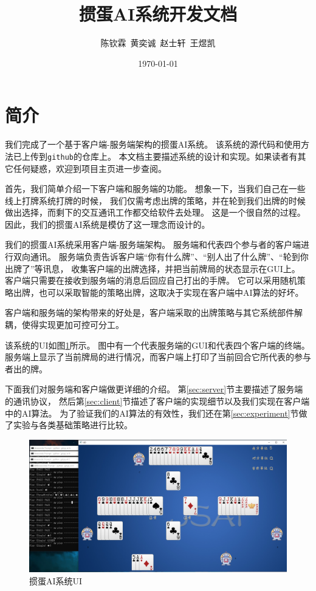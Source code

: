 \documentclass[a4paper]{ctexart}
\title{\textbf{掼蛋AI系统开发文档}}
\author{陈钦霖\ 黄奕诚\ 赵士轩\ 王煜凯}
\date{\today}
\begin{document}
\maketitle

\section{简介}
我们完成了一个基于客户端-服务端架构的掼蛋AI系统。
该系统的源代码和使用方法已上传到\texttt{github}的仓库上\cite{guandan-ai}。
本文档主要描述系统的设计和实现。如果读者有其它任何疑惑，欢迎到项目主页进一步查阅。

首先，我们简单介绍一下客户端和服务端的功能。
想象一下，当我们自己在一些线上打牌系统打牌的时候，
我们仅需考虑出牌的策略，并在轮到我们出牌的时候做出选择，而剩下的交互通讯工作都交给软件去处理。
这是一个很自然的过程。因此，我们的掼蛋AI系统是模仿了这一理念而设计的。

我们的掼蛋AI系统采用客户端-服务端架构。
服务端和代表四个参与者的客户端进行双向通讯。
服务端负责告诉客户端``你有什么牌''、``别人出了什么牌''、``轮到你出牌了''等讯息，
收集客户端的出牌选择，并把当前牌局的状态显示在GUI上。
客户端只需要在接收到服务端的消息后回应自己打出的手牌。
它可以采用随机策略出牌，也可以采取智能的策略出牌，这取决于实现在客户端中AI算法的好坏。

客户端和服务端的架构带来的好处是，客户端采取的出牌策略与其它系统部件解耦，使得实现更加可控可分工。

该系统的UI如图\ref{fig:ui}所示。
图中有一个代表服务端的GUI和代表四个客户端的终端。
服务端上显示了当前牌局的进行情况，而客户端上打印了当前回合它所代表的参与者出的牌。

下面我们对服务端和客户端做更详细的介绍。
第\ref{sec:server}节主要描述了服务端的通讯协议，
然后第\ref{sec:client}节描述了客户端的实现细节以及我们实现在客户端中的AI算法。
为了验证我们的AI算法的有效性，我们还在第\ref{sec:experiment}节做了实验与各类基础策略进行比较。

\begin{figure}
  \centering
  \includegraphics[width=\linewidth]{images/ui}
  \caption{掼蛋AI系统UI}
  \label{fig:ui}
\end{figure}
\end{document}
